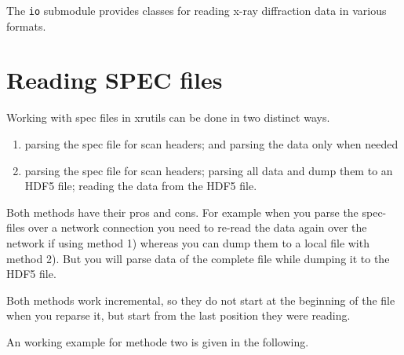%
%
%
%


The {\tt io} submodule provides classes for reading x-ray diffraction data in
various formats.

\section{Reading SPEC files}

Working with spec files in xrutils can be done in two distinct ways.
\begin{enumerate}
 \item parsing the spec file for scan headers; and parsing the data only when needed
 \item parsing the spec file for scan headers; parsing all data and dump them to an HDF5 file; reading the data from the HDF5 file.
\end{enumerate}
Both methods have their pros and cons. For example when you parse the spec-files over a network connection you need to re-read the data again over the network if using method 1) whereas you can dump them to a local file with method 2). But you will parse data of the complete file while dumping it to the HDF5 file.

Both methods work incremental, so they do not start at the beginning of the file when you reparse it, but start from the last position they were reading.

An working example for methode two is given in the following.

